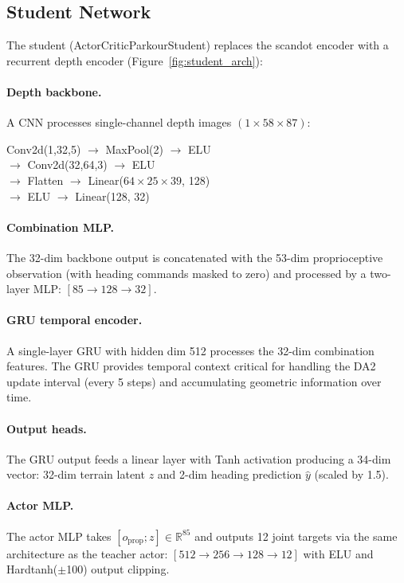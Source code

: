 \documentclass[10pt,twocolumn]{article}
\newcommand{\R}{\mathbb{R}}
\begin{document}
\subsection{Student Network}

The student (ActorCriticParkourStudent) replaces the scandot encoder
with a recurrent depth encoder (Figure~\ref{fig:student_arch}):

\paragraph{Depth backbone.}
A CNN processes single-channel depth images $(1 \times 58 \times 87)$:
\begin{center}
  \small
  Conv2d(1,32,5) $\to$ MaxPool(2) $\to$ ELU \\
  $\to$ Conv2d(32,64,3) $\to$ ELU \\
  $\to$ Flatten $\to$ Linear($64{\times}25{\times}39$, 128) \\
  $\to$ ELU $\to$ Linear(128, 32)
\end{center}

\paragraph{Combination MLP.}
The 32-dim backbone output is concatenated with the 53-dim
proprioceptive observation (with heading commands masked to zero) and
processed by a two-layer MLP: $[85 \to 128 \to 32]$.

\paragraph{GRU temporal encoder.}
A single-layer GRU with hidden dim 512 processes the 32-dim
combination features.  The GRU provides temporal context critical for
handling the DA2 update interval (every 5 steps) and accumulating
geometric information over time.

\paragraph{Output heads.}
The GRU output feeds a linear layer with Tanh activation producing
a 34-dim vector: 32-dim terrain latent $z$ and 2-dim heading
prediction $\hat{y}$ (scaled by 1.5).

\paragraph{Actor MLP.}
The actor MLP takes $[o_\text{prop}; z] \in \R^{85}$ and outputs
12 joint targets via the same architecture as the teacher actor:
$[512 \to 256 \to 128 \to 12]$ with ELU and Hardtanh($\pm$100)
output clipping.
\end{document}
